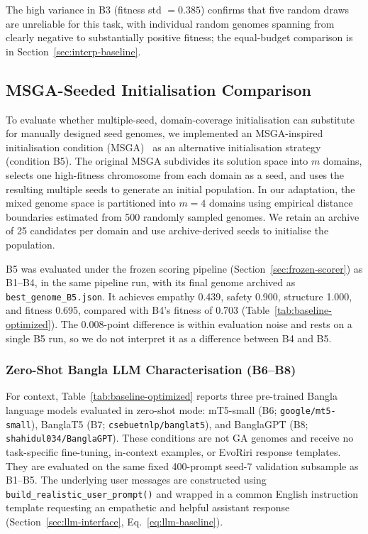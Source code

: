 \documentclass[mathematics,article,submit,xetex,moreauthors]{Definitions/mdpi}
\begin{document}
The high variance in B3 (fitness std $= 0.385$) confirms that five random
draws are unreliable for this task, with individual random genomes
spanning from clearly negative to substantially positive fitness; 
the equal-budget comparison is in Section~\ref{sec:interp-baseline}.


\subsection{MSGA-Seeded Initialisation Comparison}
\label{sec:msga}

To evaluate whether multiple-seed, domain-coverage initialisation can
substitute for manually designed seed genomes, we implemented an MSGA-inspired initialisation condition (MSGA)~\cite{kabir2017msga} as
an alternative initialisation strategy (condition B5). The original MSGA subdivides its solution space into $m$ domains, selects one
high-fitness chromosome from each domain as a seed, and uses the resulting
multiple seeds to generate an initial population. In our adaptation, the mixed genome space is
partitioned into \(m=4\) domains using empirical distance boundaries estimated
from 500 randomly sampled genomes. We retain an archive of 25 candidates per
domain and use archive-derived seeds to initialise the population.

B5 was evaluated under the frozen scoring pipeline (Section~\ref{sec:frozen-scorer}) as B1--B4, in the same pipeline
run, with its final genome archived as \texttt{best\_genome\_B5.json}. It
achieves empathy 0.439, safety 0.900, structure 1.000, and fitness 0.695,
compared with B4's fitness of 0.703
(Table~\ref{tab:baseline-optimized}). The 0.008-point difference is within evaluation noise and rests on a single
B5 run, so we do not interpret it as a difference between B4 and B5.

\subsubsection{Zero-Shot Bangla LLM Characterisation (B6--B8)}
\label{sec:llm-baselines}

For context, Table~\ref{tab:baseline-optimized} reports three pre-trained
Bangla language models evaluated in zero-shot mode: mT5-small
\cite{mt5_2021} (B6; \texttt{google/mt5-small}), BanglaT5
\cite{banglat5_2022} (B7; \texttt{csebuetnlp/banglat5}), and BanglaGPT
\cite{banglagpt_2023} (B8; \texttt{shahidul034/BanglaGPT}). These conditions
are not GA genomes and receive no task-specific fine-tuning, in-context
examples, or EvoRiri response templates. They are evaluated on the same fixed
400-prompt seed-7 validation subsample as B1--B5. The underlying user messages
are constructed using \texttt{build\_realistic\_user\_prompt()} and wrapped in
a common English instruction template requesting an empathetic and helpful
assistant response (Section~\ref{sec:llm-interface}, Eq.~\eqref{eq:llm-baseline}).
\end{document}
